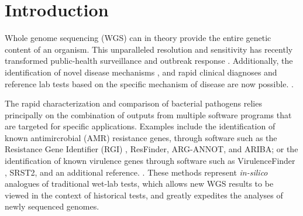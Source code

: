 \documentclass{article}
\begin{document}
\section{Introduction}

Whole genome sequencing (WGS) can in theory provide the entire genetic content of an organism. This unparalleled resolution and sensitivity has recently transformed public-health surveillance and outbreak response \cite{ronholm2016navigating,lytsy2017time}. Additionally, the identification of novel disease mechanisms \cite{wang2014whole,yuen2015whole}, and rapid clinical diagnoses and reference lab tests based on the specific mechanism of disease are now possible. \cite{willig2015whole,dewey2014clinical}.

The rapid characterization and comparison of bacterial pathogens relies principally on the combination of outputs from multiple software programs that are targeted for specific applications. Examples include the identification of known antimircrobial (AMR) resistance genes, through software such as the Resistance Gene Identifier (RGI) \cite{mcarthur2013comprehensive}, {ResFinder}, {ARG-ANNOT}, and {ARIBA}; or the identification of known virulence genes through software such as VirulenceFinder \cite{kleinheinz2014applying}, {SRST2}, and {an additional reference}. . These methods represent \textit{in-silico} analogues of traditional wet-lab tests, which allows new WGS results to be viewed in the context of historical tests, and greatly expedites the analyses of newly sequenced genomes. 
\end{document}
